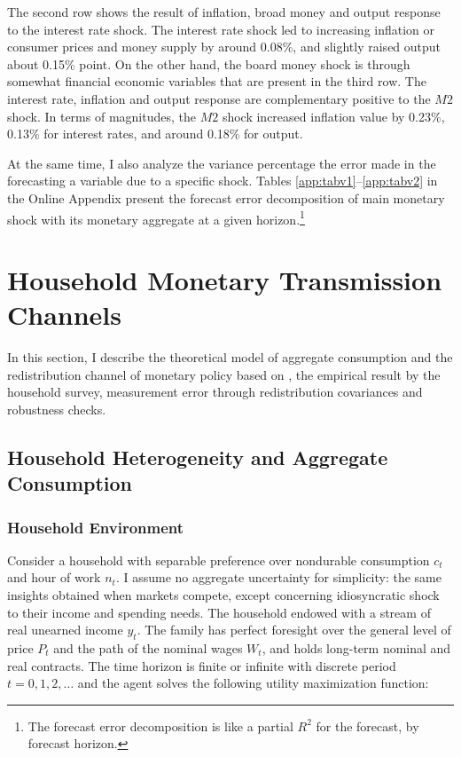 \documentclass[11pt,letterpaper]{article}
\begin{document}
{\begin{figure}[H]
\begin{tablenotes}
	\end{tablenotes} 
\end{figure}

	The second row shows the result of inflation, broad money and output response to the interest rate shock. The interest rate shock led to increasing inflation or consumer prices and money supply by around 0.08\%, and slightly raised output about 0.15\% point. On the other hand, the board money shock is through somewhat financial economic variables that are present in the third row. The interest rate, inflation and output response are complementary positive to the $M2$ shock. In terms of magnitudes, the $M2$ shock increased inflation value by 0.23\%, 0.13\% for interest rates, and around 0.18\% for output. 

	At the same time, I also analyze the variance percentage the error made in the forecasting a variable due to a specific shock. Tables \ref{app:tabv1}--\ref{app:tabv2} in the Online Appendix present the forecast error decomposition of main monetary shock with its monetary aggregate at a given horizon.\footnote{The forecast error decomposition is like a partial $R^2$ for the forecast, by forecast horizon.} 
\section{Household Monetary Transmission Channels}\label{sec:r2}
In this section, I describe the theoretical model of aggregate consumption and the redistribution channel of monetary policy based on \citet{Auclert2019}, the empirical result by the household survey, measurement error through redistribution covariances and robustness checks.   

\subsection{Household Heterogeneity and Aggregate Consumption}
\subsubsection{Household Environment}
Consider a household with separable preference over nondurable consumption $c_{t}$ and hour of work $n_{t}$. I assume no aggregate uncertainty for simplicity: the same insights obtained when markets compete, except concerning idiosyncratic shock to their income and spending needs. The household endowed with a stream of real unearned income $y_{t}$. The family has perfect foresight over the general level of price $P_{t}$ and the path of the nominal wages $W_{t}$, and holds long-term nominal and real contracts. The time horizon is finite or infinite with discrete period $t= 0, 1, 2, \ldots$ and the agent solves the following utility maximization function:  

}
\end{document}
